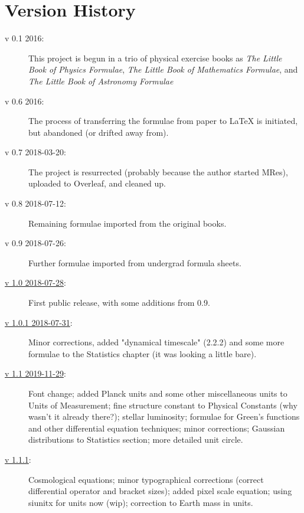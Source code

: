 \section{Version History}
\begin{description}
\item[v 0.1 2016:] This project is begun in a trio of physical exercise books as \textit{The Little Book of Physics Formulae}, \textit{The Little Book of Mathematics Formulae}, and \textit{The Little Book of Astronomy Formulae}
\item[v 0.6 2016:] The process of transferring the formulae from paper to LaTeX is initiated, but abandoned (or drifted away from).
\item[v 0.7 2018-03-20:] The project is resurrected (probably because the author started MRes), uploaded to Overleaf, and cleaned up.
\item[v 0.8 2018-07-12:] Remaining formulae imported from the original books.
\item[v 0.9 2018-07-26:] Further formulae imported from undergrad formula sheets.
\item[\href{http://www.webofworlds.net/s/ultimate-astrophysics-cheat-sheet_1-0.pdf}{v 1.0 2018-07-28}:] First public release, with some additions from 0.9.
\item[\href{http://www.webofworlds.net/s/ultimate-astrophysics-cheat-sheet_1-0-1.pdf}{v 1.0.1 2018-07-31}:] Minor corrections, added "dynamical timescale" (2.2.2) and some more formulae to the Statistics chapter (it was looking a little bare).
\item[\href{http://www.webofworlds.net/s/ultimate-astrophysics-cheat-sheet_1-1.pdf}{v 1.1 2019-11-29}:] Font change; added Planck units and some other miscellaneous units to Units of Measurement; fine structure constant to Physical Constants (why wasn't it already there?); stellar luminosity; formulae for Green's functions and other differential equation techniques; minor corrections; Gaussian distributions to Statistics section; more detailed unit circle.
\item[\href{http://www.webofworlds.net/s/ultimate-astrophysics-cheat-sheet_1-1-1.pdf}{v 1.1.1}:] Cosmological equations; minor typographical corrections (correct differential operator and bracket sizes); added pixel scale equation; using siunitx for units now (wip); correction to Earth mass in units. 

\end{description}